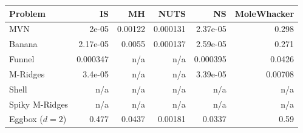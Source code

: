 \begin{tabular}{lrrrrr}
\toprule
Problem & IS & MH & NUTS & NS & MoleWhacker \\
\midrule
MVN & 2e-05 & 0.00122 & 0.000131 & 2.37e-05 & 0.298 \\
Banana & 2.17e-05 & 0.0055 & 0.000137 & 2.59e-05 & 0.271 \\
Funnel & 0.000347 & n/a & n/a & 0.000395 & 0.0426 \\
M-Ridges & 3.4e-05 & n/a & n/a & 3.39e-05 & 0.00708 \\
Shell & n/a & n/a & n/a & n/a & n/a \\
Spiky M-Ridges & n/a & n/a & n/a & n/a & n/a \\
\midrule
Eggbox ($d=2$) & 0.477 & 0.0437 & 0.00181 & 0.0337 & 0.59 \\
\bottomrule
\end{tabular}
